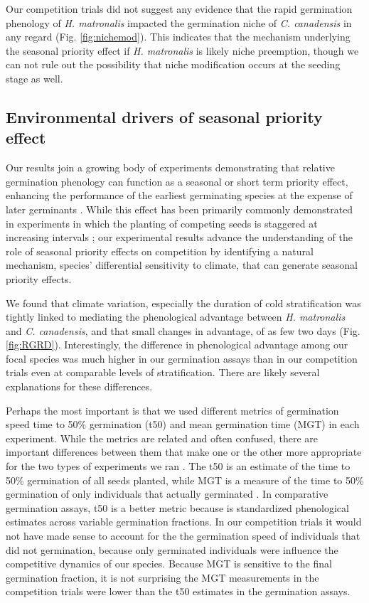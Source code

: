\documentclass{article}\usepackage[]{graphicx}\usepackage[]{color}
\begin{document}
{Our competition trials did not suggest any evidence that the rapid germination phenology of \textit{H. matronalis} impacted the germination niche of \textit{C. canadensis} in any regard (Fig. \ref{fig:nichemod}). This indicates that the mechanism underlying the seasonal priority effect if \textit{H. matronalis} is likely niche preemption, though we can not rule out the possibility that niche modification occurs at the seeding stage as well. 

\subsection*{Environmental drivers of seasonal priority effect}
Our results join a growing body of experiments demonstrating that relative germination phenology can function as a seasonal or short term priority effect, enhancing the performance of the earliest germinating species at the expense of later germinants \citep{}. While this effect has been primarily commonly demonstrated in experiments in which the planting of competing seeds is staggered at increasing intervals \citep{}; our experimental results advance the understanding of the role of seasonal priority effects on competition by identifying a natural mechanism, species' differential sensitivity to climate, that can generate seasonal priority effects.

We found that climate variation, especially the duration of cold stratification was tightly linked to mediating the phenological advantage between \textit{H. matronalis} and \textit{C. canadensis}, and that small changes in advantage, of as few two days (Fig. \ref{fig:RGRD}). Interestingly, the difference in phenological advantage among our focal species was much higher in our germination assays than in our competition trials even at comparable levels of stratification. There are likely several explanations for these differences.

Perhaps the most important is that  we used different metrics of germination speed time to 50\% germination (t50) and mean germination time (MGT) in each experiment. While the metrics are related and often confused, there are important differences between them that make one or the other more appropriate for the two types of experiments we ran \citep{}. The t50 is an estimate of the time to 50\% germination of all seeds planted, while MGT is a measure of the time to 50\% germination of only individuals that actually germinated \citep{}. In comparative germination assays, t50 is a better metric because is standardized phenological estimates across variable germination fractions. In our competition trials it would not have made sense to account for the the germination speed of individuals that did not germination, because only germinated individuals were influence the competitive dynamics of our species. Because MGT is sensitive to the final germination fraction, it is not surprising the MGT measurements in the competition trials  were lower than the t50 estimates in the germination assays.

}
\end{document}
